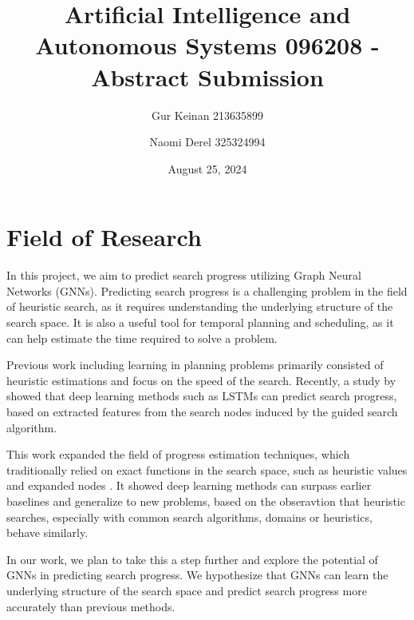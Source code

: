 \documentclass[11pt]{article}
\title{Artificial Intelligence and Autonomous Systems 096208 - Abstract Submission}
\author{Gur Keinan 213635899 \and Naomi Derel 325324994}
\date{August 25, 2024}
\begin{document}
\maketitle



\section{Field of Research}
In this project, we aim to predict search progress utilizing Graph Neural Networks (GNNs). Predicting search progress is a challenging problem in the field of heuristic search, as it requires understanding the underlying structure of the search space. It is also a useful tool for temporal planning and scheduling, as it can help estimate the time required to solve a problem.

Previous work including learning in planning problems primarily consisted of heuristic estimations and focus on the speed of the search. Recently, a study by \citet{sudry2022learning} showed that deep learning methods such as LSTMs can predict search progress, based on extracted features from the search nodes induced by the guided search algorithm. 

This work expanded the field of progress estimation techniques, which traditionally relied on exact functions in the search space, such as heuristic values and expanded nodes \cite{thayer2012we}. It showed deep learning methods can surpass earlier baselines and generalize to new problems, based on the obseravtion that heuristic searches, especially with common search algorithms, domains or heuristics, behave similarly.

In our work, we plan to take this a step further and explore the potential of GNNs in predicting search progress. We hypothesize that GNNs can learn the underlying structure of the search space and predict search progress more accurately than previous methods. 

\end{document}
